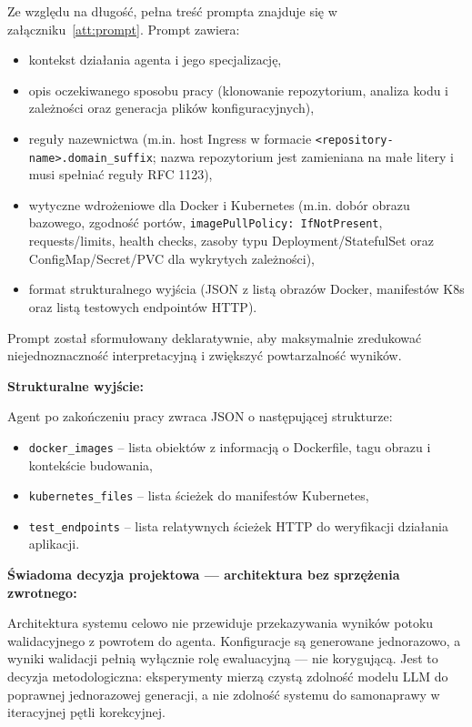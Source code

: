 Ze względu na długość, pełna treść prompta znajduje się w załączniku~\ref{att:prompt}. Prompt zawiera:
\begin{itemize}
    \item kontekst działania agenta i jego specjalizację,
    \item opis oczekiwanego sposobu pracy (klonowanie repozytorium, analiza kodu i zależności oraz generacja plików konfiguracyjnych),
    \item reguły nazewnictwa (m.in. host Ingress w formacie \texttt{<repository-name>.{domain\_suffix}}; nazwa repozytorium jest zamieniana na małe litery i musi spełniać reguły RFC 1123),
    \item wytyczne wdrożeniowe dla Docker i Kubernetes (m.in. dobór obrazu bazowego, zgodność portów, \texttt{imagePullPolicy: IfNotPresent}, requests/limits, health checks, zasoby typu Deployment/StatefulSet oraz ConfigMap/Secret/PVC dla wykrytych zależności),
    \item format strukturalnego wyjścia (JSON z listą obrazów Docker, manifestów K8s oraz listą testowych endpointów HTTP).
\end{itemize}

Prompt został sformułowany deklaratywnie, aby maksymalnie zredukować niejednoznaczność interpretacyjną i zwiększyć powtarzalność wyników.

\bigskip
\noindent
\textbf{Strukturalne wyjście:}

Agent po zakończeniu pracy zwraca JSON o następującej strukturze:
\begin{itemize}
    \item \texttt{docker\_images} – lista obiektów z informacją o Dockerfile, tagu obrazu i kontekście budowania,
    \item \texttt{kubernetes\_files} – lista ścieżek do manifestów Kubernetes,
    \item \texttt{test\_endpoints} – lista relatywnych ścieżek HTTP do weryfikacji działania aplikacji.
\end{itemize}

\bigskip
\noindent
\textbf{Świadoma decyzja projektowa — architektura bez sprzężenia zwrotnego:}

Architektura systemu celowo nie przewiduje przekazywania wyników potoku walidacyjnego z powrotem do agenta. Konfiguracje są generowane jednorazowo, a wyniki walidacji pełnią wyłącznie rolę ewaluacyjną — nie korygującą. Jest to decyzja metodologiczna: eksperymenty mierzą czystą zdolność modelu LLM do poprawnej jednorazowej generacji, a nie zdolność systemu do samonaprawy w iteracyjnej pętli korekcyjnej.

